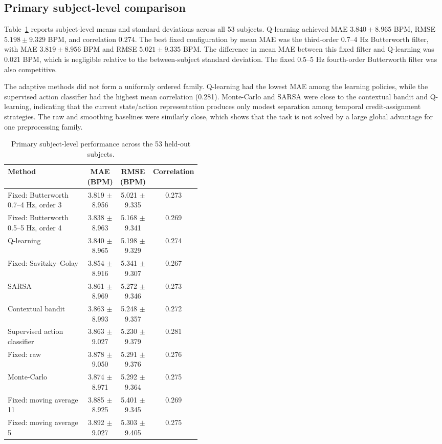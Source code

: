 \documentclass{elektr}
\begin{document}
\subsection{Primary subject-level comparison}

Table~\ref{tab:primary} reports subject-level means and standard deviations across all 53 subjects. Q-learning achieved MAE $3.840\pm8.965$ BPM, RMSE $5.198\pm9.329$ BPM, and correlation 0.274. The best fixed configuration by mean MAE was the third-order 0.7--4 Hz Butterworth filter, with MAE $3.819\pm8.956$ BPM and RMSE $5.021\pm9.335$ BPM. The difference in mean MAE between this fixed filter and Q-learning was 0.021 BPM, which is negligible relative to the between-subject standard deviation. The fixed 0.5--5 Hz fourth-order Butterworth filter was also competitive.

The adaptive methods did not form a uniformly ordered family. Q-learning had the lowest MAE among the learning policies, while the supervised action classifier had the highest mean correlation (0.281). Monte-Carlo and SARSA were close to the contextual bandit and Q-learning, indicating that the current state/action representation produces only modest separation among temporal credit-assignment strategies. The raw and smoothing baselines were similarly close, which shows that the task is not solved by a large global advantage for one preprocessing family.

\begin{table}[h!]
\caption{Primary subject-level performance across the 53 held-out subjects.}
\label{tab:primary}
\begin{center}
\small
\begin{tabular}{p{0.44\linewidth}ccc}
\toprule
Method & MAE (BPM) & RMSE (BPM) & Correlation \\
\midrule
Fixed: Butterworth 0.7--4 Hz, order 3 & 3.819 $\pm$ 8.956 & 5.021 $\pm$ 9.335 & 0.273 \\
Fixed: Butterworth 0.5--5 Hz, order 4 & 3.838 $\pm$ 8.963 & 5.168 $\pm$ 9.341 & 0.269 \\
Q-learning & 3.840 $\pm$ 8.965 & 5.198 $\pm$ 9.329 & 0.274 \\
Fixed: Savitzky--Golay & 3.854 $\pm$ 8.916 & 5.341 $\pm$ 9.307 & 0.267 \\
SARSA & 3.861 $\pm$ 8.969 & 5.272 $\pm$ 9.346 & 0.273 \\
Contextual bandit & 3.863 $\pm$ 8.993 & 5.248 $\pm$ 9.357 & 0.272 \\
Supervised action classifier & 3.863 $\pm$ 9.027 & 5.230 $\pm$ 9.379 & 0.281 \\
Fixed: raw & 3.878 $\pm$ 9.050 & 5.291 $\pm$ 9.376 & 0.276 \\
Monte-Carlo & 3.874 $\pm$ 8.971 & 5.292 $\pm$ 9.364 & 0.275 \\
Fixed: moving average 11 & 3.885 $\pm$ 8.925 & 5.401 $\pm$ 9.345 & 0.269 \\
Fixed: moving average 5 & 3.892 $\pm$ 9.027 & 5.303 $\pm$ 9.405 & 0.275 \\
\bottomrule
\end{tabular}
\end{center}
\vs{-4mm}
\end{table}
\end{document}
